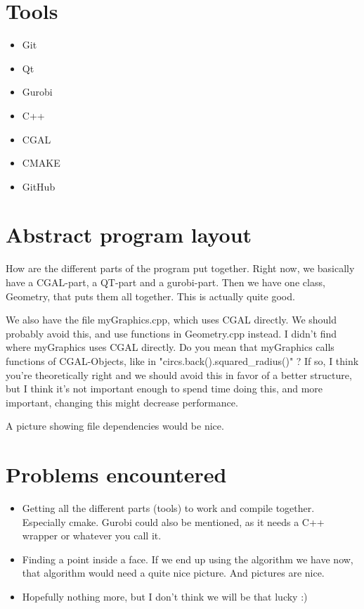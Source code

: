 \documentclass[a4paper,12pt]{article}
\begin{document}
\section{Tools}
\begin{itemize}
\item
Git
\item
Qt
\item
Gurobi
\item
C++
\item
CGAL
\item
CMAKE
\item
GitHub
\end{itemize}

\section{Abstract program layout}
How are the different parts of the program put together. Right now, we basically have a CGAL-part, a QT-part and a gurobi-part. Then we have one class, Geometry, that puts them all together. This is actually quite good.

We also have the file myGraphics.cpp, which uses CGAL directly. We should probably avoid this, and use functions in Geometry.cpp instead.
I didn't find where myGraphics uses CGAL directly. Do you mean that myGraphics calls functions of CGAL-Objects, like in "circs.back().squared_radius()" ?
If so, I think you're theoretically right and we should avoid this in favor of a better structure, but I think it's not important enough to spend time doing this, and more important, changing this might decrease performance.

A picture showing file dependencies would be nice.

\section{Problems encountered}
\begin{itemize}
\item
Getting all the different parts (tools) to work and compile together. Especially cmake. Gurobi could also be mentioned, as it needs a C++ wrapper or whatever you call it.
\item
Finding a point inside a face. If we end up using the algorithm we have now, that algorithm would need a quite nice picture. And pictures are nice.
\item
Hopefully nothing more, but I don't think we will be that lucky :)
\end{itemize}
\end{document}
